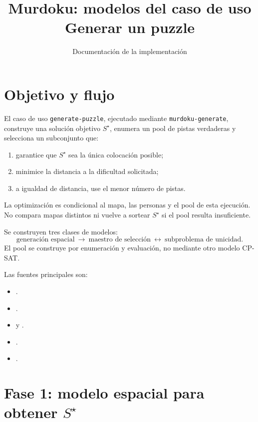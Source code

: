 \documentclass[11pt,a4paper]{article}
\title{Murdoku: modelos del caso de uso\\Generar un puzzle}
\author{Documentaci\'on de la implementaci\'on}
\date{}
\begin{document}
\maketitle

\section{Objetivo y flujo}

El caso de uso \texttt{generate-puzzle}, ejecutado mediante
\texttt{murdoku-generate}, construye una soluci\'on objetivo $S^\star$,
enumera un pool de pistas verdaderas y selecciona un subconjunto que:
\begin{enumerate}
  \item garantice que $S^\star$ sea la \'unica colocaci\'on posible;
  \item minimice la distancia a la dificultad solicitada;
  \item a igualdad de distancia, use el menor n\'umero de pistas.
\end{enumerate}
La optimizaci\'on es condicional al mapa, las personas y el pool de
esta ejecuci\'on. No compara mapas distintos ni vuelve a sortear
$S^\star$ si el pool resulta insuficiente.

Se construyen tres clases de modelos:
\[
 \text{generaci\'on espacial}
 \ \longrightarrow\ \text{maestro de selecci\'on}
 \ \longleftrightarrow\ \text{subproblema de unicidad}.
\]
El pool se construye por enumeraci\'on y evaluaci\'on, no mediante
otro modelo CP-SAT.

Las fuentes principales son:
\begin{itemize}
  \item {}.
  \item {}.
  \item {}
        y .
  \item {}.
  \item {}.
\end{itemize}

\section{Fase 1: modelo espacial para obtener $S^\star$}
\end{document}
